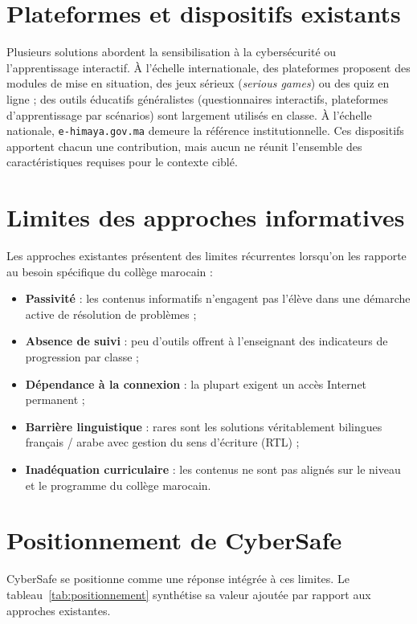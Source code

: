 \documentclass[12pt, a4paper, oneside]{report}
\begin{document}
\section{Plateformes et dispositifs existants}
Plusieurs solutions abordent la sensibilisation à la cybersécurité ou l'apprentissage interactif. À l'échelle internationale, des plateformes proposent des modules de mise en situation, des jeux sérieux (\textit{serious games}) ou des quiz en ligne ; des outils éducatifs généralistes (questionnaires interactifs, plateformes d'apprentissage par scénarios) sont largement utilisés en classe. À l'échelle nationale, \texttt{e-himaya.gov.ma} demeure la référence institutionnelle. Ces dispositifs apportent chacun une contribution, mais aucun ne réunit l'ensemble des caractéristiques requises pour le contexte ciblé.

\section{Limites des approches informatives}
Les approches existantes présentent des limites récurrentes lorsqu'on les rapporte au besoin spécifique du collège marocain :
\begin{itemize}[leftmargin=*]
  \item \textbf{Passivité} : les contenus informatifs n'engagent pas l'élève dans une démarche active de résolution de problèmes ;
  \item \textbf{Absence de suivi} : peu d'outils offrent à l'enseignant des indicateurs de progression par classe ;
  \item \textbf{Dépendance à la connexion} : la plupart exigent un accès Internet permanent ;
  \item \textbf{Barrière linguistique} : rares sont les solutions véritablement bilingues français / arabe avec gestion du sens d'écriture (RTL) ;
  \item \textbf{Inadéquation curriculaire} : les contenus ne sont pas alignés sur le niveau et le programme du collège marocain.
\end{itemize}

\section{Positionnement de CyberSafe}
CyberSafe se positionne comme une réponse intégrée à ces limites. Le tableau~\ref{tab:positionnement} synthétise sa valeur ajoutée par rapport aux approches existantes.
\end{document}
